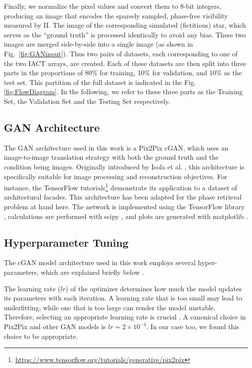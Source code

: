 Finally, we normalize the pixel values and convert them to 8-bit integers, producing an image that encodes the sparsely sampled, phase-free visibility measured by II. The image of the corresponding simulated (fictitious) star, which serves as the ``ground truth'' is processed identically to avoid any bias. These two images are merged side-by-side into a single 
image (as shown in Fig.~\ref{fig:GANinput}). Thus two pairs of datasets, each corresponding to one of the two IACT arrays, are created. Each of these datasets are then split into three parts in the proportions of 80\% for training, 10\% for validation, and 10\% as the test set. This partition of the full dataset is indicated in the Fig.\ref{fig:FlowDiagram}. In the following, we refer to these three parts as the Training Set, the Validation Set and the Testing Set respectively.

\subsection{GAN Architecture}
The GAN architecture used in this work is a Pix2Pix cGAN, which uses an image-to-image translation strategy with both the ground truth and the condition being images. Originally introduced by Isola et al. \citep{isola2017image}, this architecture is specifically suitable for image processing and reconstruction objectives. For instance, the TensorFlow tutorials\footnote{\url{https://www.tensorflow.org/tutorials/generative/pix2pix}} demonstrate its application to a dataset of architectural facades. This architecture has been adapted
for the phase retrieval problem at hand here. The network is implemented using the TensorFlow library \citep{abadi2016tensorflow}, calculations are performed with scipy \citep{virtanen2020scipy}, and plots are generated with matplotlib \citep{4160265}.

\subsection{Hyperparameter Tuning}
The cGAN model architecture used in this work employs several hyper-parameters, which are explained briefly below \citep[for a more in-depth discussion, see][]{murphy2022probabilistic}.

The learning rate ($lr$) of the optimizer determines how much the model updates its parameters with each iteration. A learning rate that is too small may lead to underfitting, while one that is too large can render the model unstable. Therefore, selecting an appropriate learning rate is crucial \citep{murphy2022probabilistic}. A canonical choice in Pix2Pix and other GAN models is $lr = 2\times10^{-4}$. In our case too, we found this choice to be appropriate.

